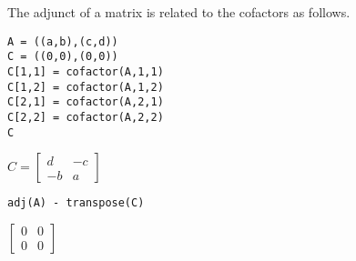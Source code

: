 The adjunct of a matrix is related to the cofactors as follows.

\begin{Verbatim}[formatcom=\color{blue},samepage=true]
A = ((a,b),(c,d))
C = ((0,0),(0,0))
C[1,1] = cofactor(A,1,1)
C[1,2] = cofactor(A,1,2)
C[2,1] = cofactor(A,2,1)
C[2,2] = cofactor(A,2,2)
C
\end{Verbatim}

$\displaystyle C=\begin{bmatrix}d&-c\\-b&a\end{bmatrix}$

\begin{Verbatim}[formatcom=\color{blue},samepage=true]
adj(A) - transpose(C)
\end{Verbatim}

$\displaystyle \begin{bmatrix}0&0\\0&0\end{bmatrix}$
